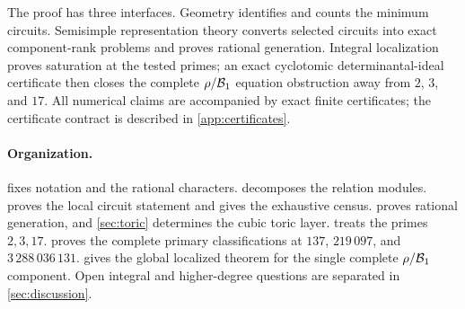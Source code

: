 The proof has three interfaces.  Geometry identifies and counts the
minimum circuits.  Semisimple representation theory converts selected
circuits into exact component-rank problems and proves rational
generation.  Integral localization proves saturation at the tested
primes; an exact cyclotomic determinantal-ideal certificate then closes
the complete \(\rho/\mathcal B_1\) equation obstruction away from \(2\), \(3\),
and \(17\).  All numerical claims are accompanied by exact finite
certificates; the certificate contract is described in
\cref{app:certificates}.

\paragraph{Organization.}
 fixes notation and the rational characters.
 decomposes the relation modules.
 proves the local circuit statement and gives the
exhaustive census.   proves rational
generation, and \cref{sec:toric} determines the cubic toric layer.
 treats the primes \(2,3,17\).
 proves the complete primary classifications at
\(137\), \(219\,097\), and \(3\,288\,036\,131\).
 gives the global localized theorem for the single
complete \(\rho/\mathcal B_1\) component.  Open integral and higher-degree
questions are separated in \cref{sec:discussion}.
